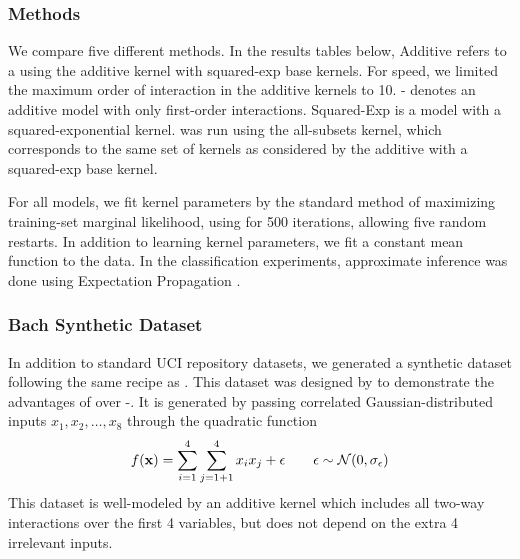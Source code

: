 \subsubsection{Methods}

We compare five different methods.
In the results tables below, \gp{} Additive refers to a \gp{} using the additive kernel with squared-exp base kernels.
For speed, we limited the maximum order of interaction in the additive kernels to 10.
\gp{}-\GAM{} denotes an additive \gp{} model with only first-order interactions.
\gp{} Squared-Exp is a \gp{} model with a squared-exponential \ARD{} kernel.
\HKL{} was run using the all-subsets kernel, which corresponds to the same set of kernels as considered by the additive \gp{} with a squared-exp base kernel.     

For all \gp{} models, we fit kernel parameters by the standard method of maximizing training-set marginal likelihood, using \LBFGS{} \citep{nocedal1980updating} for 500 iterations, allowing five random restarts.
In addition to learning kernel parameters, we fit a constant mean function to the data.
In the classification experiments, approximate \gp{} inference was done using Expectation Propagation \citep{minka2001expectation}.

\subsubsection{Bach Synthetic Dataset}
In addition to standard UCI repository datasets, we generated a synthetic dataset following the same recipe as \citet{DBLP:journals/corr/abs-0909-0844}.
This dataset was designed by \citet{DBLP:journals/corr/abs-0909-0844} to demonstrate the advantages of \HKL{} over \gp{}-\ARD{}.
It is generated by passing correlated Gaussian-distributed inputs $x_1, x_2, \dots, x_8$ through the quadratic function
%
\begin{align}
f({\bf{x}}) = \sum_{i=1}^4 \sum_{j=1+1}^4 x_i x_j + \epsilon \qquad    \epsilon \sim \mathcal{N}\!\left(0,\sigma_\epsilon\right)
\end{align}
%
This dataset is well-modeled by an additive kernel which includes all two-way interactions over the first 4 variables, but does not depend on the extra 4 irrelevant inputs.%

